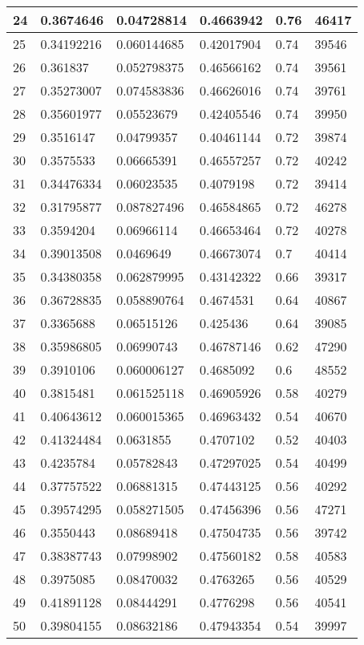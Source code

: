 \begin{longtable}{|l|l|l|l|l|l|}
24 & 0.3674646 & 0.04728814 & 0.4663942 & 0.76 & 46417 \\ \hline 
25 & 0.34192216 & 0.060144685 & 0.42017904 & 0.74 & 39546 \\ \hline 
26 & 0.361837 & 0.052798375 & 0.46566162 & 0.74 & 39561 \\ \hline 
27 & 0.35273007 & 0.074583836 & 0.46626016 & 0.74 & 39761 \\ \hline 
28 & 0.35601977 & 0.05523679 & 0.42405546 & 0.74 & 39950 \\ \hline 
29 & 0.3516147 & 0.04799357 & 0.40461144 & 0.72 & 39874 \\ \hline 
30 & 0.3575533 & 0.06665391 & 0.46557257 & 0.72 & 40242 \\ \hline 
31 & 0.34476334 & 0.06023535 & 0.4079198 & 0.72 & 39414 \\ \hline 
32 & 0.31795877 & 0.087827496 & 0.46584865 & 0.72 & 46278 \\ \hline 
33 & 0.3594204 & 0.06966114 & 0.46653464 & 0.72 & 40278 \\ \hline 
34 & 0.39013508 & 0.0469649 & 0.46673074 & 0.7 & 40414 \\ \hline 
35 & 0.34380358 & 0.062879995 & 0.43142322 & 0.66 & 39317 \\ \hline 
36 & 0.36728835 & 0.058890764 & 0.4674531 & 0.64 & 40867 \\ \hline 
37 & 0.3365688 & 0.06515126 & 0.425436 & 0.64 & 39085 \\ \hline 
38 & 0.35986805 & 0.06990743 & 0.46787146 & 0.62 & 47290 \\ \hline 
39 & 0.3910106 & 0.060006127 & 0.4685092 & 0.6 & 48552 \\ \hline 
40 & 0.3815481 & 0.061525118 & 0.46905926 & 0.58 & 40279 \\ \hline 
41 & 0.40643612 & 0.060015365 & 0.46963432 & 0.54 & 40670 \\ \hline 
42 & 0.41324484 & 0.0631855 & 0.4707102 & 0.52 & 40403 \\ \hline 
43 & 0.4235784 & 0.05782843 & 0.47297025 & 0.54 & 40499 \\ \hline 
44 & 0.37757522 & 0.06881315 & 0.47443125 & 0.56 & 40292 \\ \hline 
45 & 0.39574295 & 0.058271505 & 0.47456396 & 0.56 & 47271 \\ \hline 
46 & 0.3550443 & 0.08689418 & 0.47504735 & 0.56 & 39742 \\ \hline 
47 & 0.38387743 & 0.07998902 & 0.47560182 & 0.58 & 40583 \\ \hline 
48 & 0.3975085 & 0.08470032 & 0.4763265 & 0.56 & 40529 \\ \hline 
49 & 0.41891128 & 0.08444291 & 0.4776298 & 0.56 & 40541 \\ \hline 
50 & 0.39804155 & 0.08632186 & 0.47943354 & 0.54 & 39997 \\ \hline 
\end{longtable}